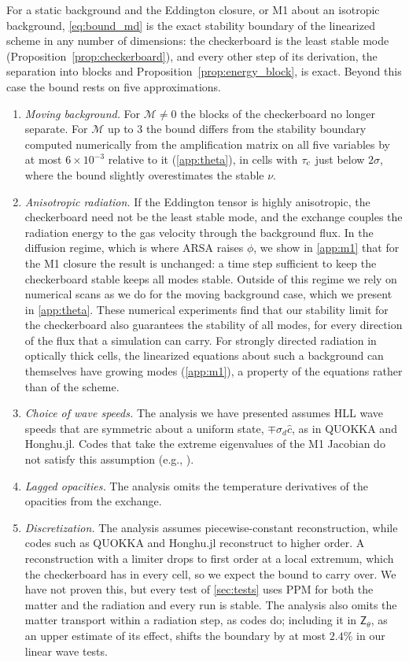 \documentclass[preprint,12pt,authoryear]{elsarticle}
\newcommand{\tenZ}{\mathsf{Z}}
\newcommand{\calM}{\mathcal{M}}
\begin{document}
For a static background and the Eddington closure, or M1 about an isotropic background, \autoref{eq:bound_md} is the exact stability boundary of the linearized scheme in any number of dimensions: the checkerboard is the least stable mode (Proposition~\ref{prop:checkerboard}), and every other step of its derivation, the separation into blocks and Proposition~\ref{prop:energy_block}, is exact. Beyond this case the bound rests on five approximations.
\begin{enumerate}
    \item \emph{Moving background.} For $\calM \neq 0$ the blocks of the checkerboard no longer separate. For $\calM$ up to 3 the bound differs from the stability boundary computed numerically from the amplification matrix on all five variables by at most $6\times10^{-3}$ relative to it (\ref{app:theta}), in cells with $\tau_{\rm c}$ just below $2\sigma$, where the bound slightly overestimates the stable $\nu$.
    \item \emph{Anisotropic radiation.} If the Eddington tensor is highly anisotropic, the checkerboard need not be the least stable mode, and the exchange couples the radiation energy to the gas velocity through the background flux. In the diffusion regime, which is where ARSA raises $\phi$, we show in \ref{app:m1} that for the M1 closure the result is unchanged: a time step sufficient to keep the checkerboard stable keeps all modes stable. Outside of this regime we rely on numerical scans as we do for the moving background case, which we present in \ref{app:theta}. These numerical experiments find that our stability limit for the checkerboard also guarantees the stability of all modes, for every direction of the flux that a simulation can carry. For strongly directed radiation in optically thick cells, the linearized equations about such a background can themselves have growing modes (\ref{app:m1}), a property of the equations rather than of the scheme.
    \item \emph{Choice of wave speeds.} The analysis we have presented assumes HLL wave speeds that are symmetric about a uniform state, $\mp\sigma_d\hat{c}$, as in QUOKKA and Honghu.jl. Codes that take the extreme eigenvalues of the M1 Jacobian do not satisfy this assumption (e.g., \citealt{Skinner13a}).
    \item \emph{Lagged opacities.} The analysis omits the temperature derivatives of the opacities from the exchange.
    \item \emph{Discretization.} The analysis assumes piecewise-constant reconstruction, while codes such as QUOKKA and Honghu.jl reconstruct to higher order. A reconstruction with a limiter drops to first order at a local extremum, which the checkerboard has in every cell, so we expect the bound to carry over. We have not proven this, but every test of \autoref{sec:tests} uses PPM for both the matter and the radiation and every run is stable. 
    The analysis also omits the matter transport within a radiation step, as codes do; including it in $\tenZ_\theta$, as an upper estimate of its effect, shifts the boundary by at most $2.4\%$ in our linear wave tests.
\end{enumerate}
\end{document}
